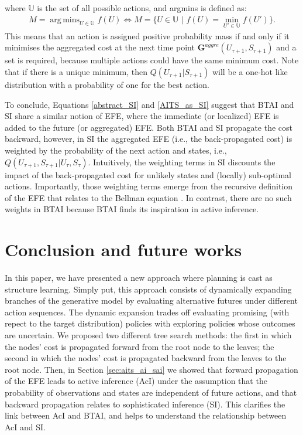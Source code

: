 \documentclass[twoside,11pt]{article}
\DeclareMathOperator*{\argmins}{arg\,mins}
\begin{document}
where $\mathbb{U}$ is the set of all possible actions, and argmins is defined as:
\begin{align}
M = \argmins_{U \in \mathbb{U}} f(U) \Leftrightarrow M = \Big\{ U \in \mathbb{U} \,\,\big|\,\, f(U) = \min_{U' \in \mathbb{U}} f(U')\Big\}.
\end{align}
This means that an action is assigned positive probability mass if and only if it minimises the aggregated cost at the next time point $\bm{G}^{aggre}(U_{\tau+1},S_{\tau+1})$ and a set is required, because multiple actions could have the same minimum cost. Note that if there is a unique minimum, then $Q(U_{\tau+1}|S_{\tau+1})$ will be a one-hot like distribution with a probability of one for the best action. 

To conclude, Equations \eqref{abstract_SI} and \eqref{AITS_as_SI} suggest that BTAI and SI share a similar notion of EFE, where the immediate (or localized) EFE is added to the future (or aggregated) EFE. Both BTAI and SI propagate the cost backward, however, in SI the aggregated EFE (i.e., the back-propagated cost) is weighted by the probability of the next action and states, i.e., $Q(U_{\tau+1},S_{\tau+1}|U_\tau,S_\tau)$. Intuitively, the weighting terms in SI discounts the impact of the back-propagated cost for unlikely states and (locally) sub-optimal actions. Importantly, those weighting terms emerge from the recursive definition of the EFE that relates to the Bellman equation \citep{dacosta2020relationship}. In contrast, there are no such weights in BTAI because BTAI finds its inspiration in active inference.

\section{Conclusion and future works} \label{sec:conclusion}

In this paper, we have presented a new approach where planning is cast as structure learning. Simply put, this approach consists of dynamically expanding branches of the generative model by evaluating alternative futures under different action sequences. The dynamic expansion trades off evaluating promising (with repect to the target distribution) policies with exploring policies whose outcomes are uncertain. We proposed two different tree search methods: the first in which the nodes' cost is propagated forward from the root node to the leaves; the second in which the nodes' cost is propagated backward from the leaves to the root node. Then, in Section \ref{sec:aits_ai_sai} we showed that forward propagation of the EFE leads to active inference (AcI) under the assumption that the probability of observations and states are independent of future actions, and that backward propagation relates to sophisticated inference (SI). This clarifies the link between AcI and BTAI, and helps to understand the relationship between AcI and SI.
\end{document}
